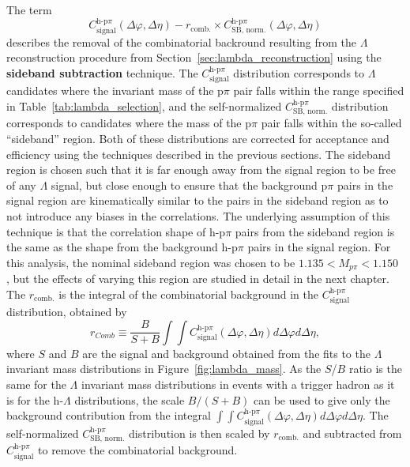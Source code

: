 The term
%
\begin{equation}
C_{\text{signal}}^{\text{h-p}\pi}(\Delta\varphi, \Delta\eta) - r_{\text{comb.}} \times C_{\text{SB, norm.}}^{\text{h-p}\pi}(\Delta\varphi, \Delta\eta)
\end{equation}
%
describes the removal of the combinatorial backround resulting from the $\Lambda$ reconstruction procedure from Section~\ref{sec:lambda_reconstruction} using the \textbf{sideband subtraction} technique. The $C_{\text{signal}}^{\text{h-p}\pi}$ distribution corresponds to $\Lambda$ candidates where the invariant mass of the p$\pi$ pair falls within the range specified in Table~\ref{tab:lambda_selection}, and the self-normalized $C_{\text{SB, norm.}}^{\text{h-p}\pi}$ distribution corresponds to candidates where the mass of the p$\pi$ pair falls within the so-called ``sideband'' region. Both of these distributions are corrected for acceptance and efficiency using the techniques described in the previous sections. The sideband region is chosen such that it is far enough away from the signal region to be free of any $\Lambda$ signal, but close enough to ensure that the background p$\pi$ pairs in the signal region are kinematically similar to the pairs in the sideband region as to not introduce any biases in the correlations. The underlying assumption of this technique is that the correlation shape of h-p$\pi$ pairs from the sideband region is the same as the shape from the background h-p$\pi$ pairs in the signal region. For this analysis, the nominal sideband region was chosen to be $1.135 < M_{p\pi} < 1.150$ \GeVmass, but the effects of varying this region are studied in detail in the next chapter. The $r_{\text{comb.}}$ is the integral of the combinatorial background in the $C_{\text{signal}}^{\text{h-p}\pi}$  distribution, obtained by 
%
\begin{equation}
	r_{Comb} \equiv \frac{B}{S+B} \int\int C_{\text{signal}}^{\text{h-p}\pi}(\Delta\varphi, \Delta\eta) d\Delta\varphi d\Delta\eta,
\end{equation}
%
where $S$ and $B$ are the signal and background obtained from the fits to the $\Lambda$ invariant mass distributions in Figure~\ref{fig:lambda_mass}. As the $S$/$B$ ratio is the same for the $\Lambda$ invariant mass distributions in events with a trigger hadron as it is for the h-$\Lambda$ distributions, the scale $B/(S+B)$ can be used to give only the background contribution from the integral $\int\int C_{\text{signal}}^{\text{h-p}\pi}(\Delta\varphi, \Delta\eta) d\Delta\varphi d\Delta\eta$. The self-normalized $C_{\text{SB, norm.}}^{\text{h-p}\pi}$ distribution is then scaled by $r_{\text{comb.}}$ and subtracted from $C_{\text{signal}}^{\text{h-p}\pi}$ to remove the combinatorial background.


